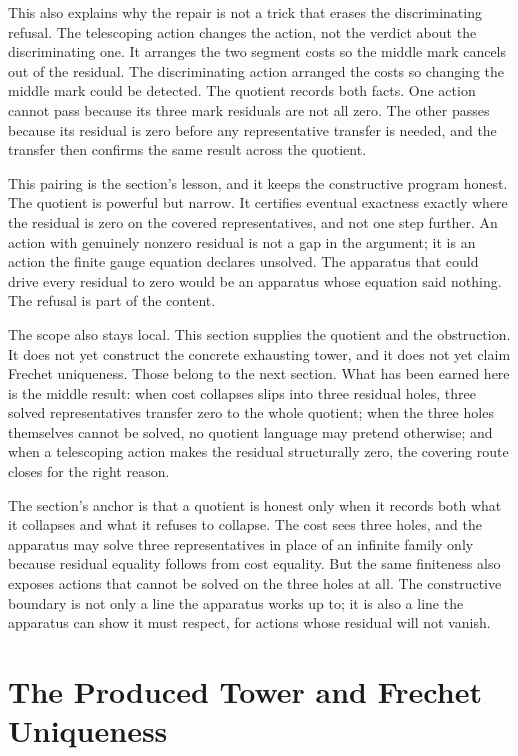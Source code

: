 This also explains why the repair is not a trick that erases the discriminating
refusal. The telescoping action changes the action, not the verdict about the
discriminating one. It arranges the two segment costs so the middle mark cancels
out of the residual. The discriminating action arranged the costs so changing
the middle mark could be detected. The quotient records both facts. One action
cannot pass because its three mark residuals are not all zero. The other passes
because its residual is zero before any representative transfer is needed, and
the transfer then confirms the same result across the quotient.

This pairing is the section's lesson, and it keeps the constructive program
honest. The quotient is powerful but narrow. It certifies eventual exactness
exactly where the residual is zero on the covered representatives, and not one
step further. An action with genuinely nonzero residual is not a gap in the
argument; it is an action the finite gauge equation declares unsolved. The
apparatus that could drive every residual to zero would be an apparatus whose
equation said nothing. The refusal is part of the content.

The scope also stays local. This section supplies the quotient and the
obstruction. It does not yet construct the concrete exhausting tower, and it does
not yet claim Frechet uniqueness. Those belong to the next section. What has been
earned here is the middle result: when cost collapses slips into three residual
holes, three solved representatives transfer zero to the whole quotient; when the
three holes themselves cannot be solved, no quotient language may pretend
otherwise; and when a telescoping action makes the residual structurally zero,
the covering route closes for the right reason.

The section's anchor is that a quotient is honest only when it records both what
it collapses and what it refuses to collapse. The cost sees three holes, and the
apparatus may solve three representatives in place of an infinite family only
because residual equality follows from cost equality. But the same finiteness
also exposes actions that cannot be solved on the three holes at all. The
constructive boundary is not only a line the apparatus works up to; it is also a
line the apparatus can show it must respect, for actions whose residual will not
vanish.

\section{The Produced Tower and Frechet Uniqueness}

